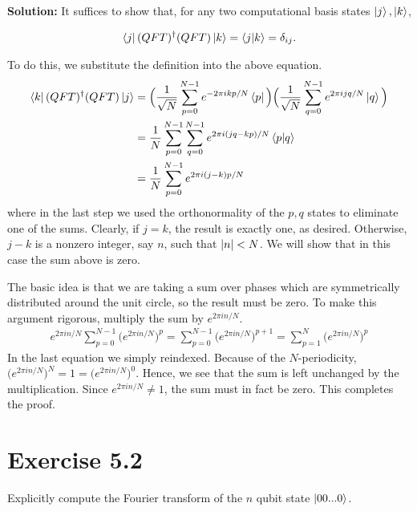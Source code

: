 \documentclass{book}
\begin{document}
    \textbf{Solution:} It suffices to show that, for any two computational basis states $\ket{j}, \ket{k}$,
    
    \begin{align} \label{eq:5.1:QFT_unitary}
        \bra{j}(QFT)^\dagger(QFT)\ket{k} = \braket{j}{k} = \delta_{ij}.
    \end{align}
    
    To do this, we substitute the definition into the above equation. 
    \begin{align} \label{eq:5.1:expand_and_simplify}
    \begin{aligned}
        \bra{k}(QFT)^\dagger(QFT)\ket{j} &= \Big(\frac{1}{\sqrt{N}}\sum_{p=0}^{N-1}e^{-2\pi ikp/N}\bra{p}\Big)\Big(\frac{1}{\sqrt{N}}\sum_{q=0}^{N-1}e^{2\pi ijq/N}\ket{q}\Big) \\
        &= \frac{1}{N}\sum_{p=0}^{N-1}\sum_{q=0}^{N-1}e^{2\pi i(jq-kp)/N}\braket{p}{q} \\
        &= \frac{1}{N}\sum_{p=0}^{N-1} e^{2\pi i (j-k)p/N}
    \end{aligned}
    \end{align}
    where in the last step we used the orthonormality of the $p,q$ states to eliminate one of the sums. Clearly, if $j=k$, the result is exactly one, as desired. Otherwise, $j-k$ is a nonzero integer, say $n$, such that $\abs{n}<N$. We will show that in this case the sum above is zero. 
    
    The basic idea is that we are taking a sum over phases which are symmetrically distributed around the unit circle, so the result must be zero. To make this argument rigorous, multiply the sum by $e^{2\pi i n/N}$.
    \begin{align}
        e^{2\pi i n/N}\sum_{p=0}^{N-1}\big(e^{2\pi i n/N}\big)^p = \sum_{p=0}^{N-1}\big(e^{2\pi i n/N}\big)^{p+1} = \sum_{p=1}^{N}\big(e^{2\pi i n/N}\big)^{p}
    \end{align}
    In the last equation we simply reindexed. Because of the $N$-periodicity, $\big(e^{2\pi i n/N}\big)^N = 1 = \big(e^{2\pi i n/N}\big)^0$. Hence, we see that the sum is left unchanged by the multiplication. Since $e^{2\pi i n/N} \neq 1$, the sum must in fact be zero. This completes the proof.

\section*{Exercise 5.2}
    Explicitly compute the Fourier transform of the $n$ qubit state $\ket{00...0}$.
    
\end{document}

